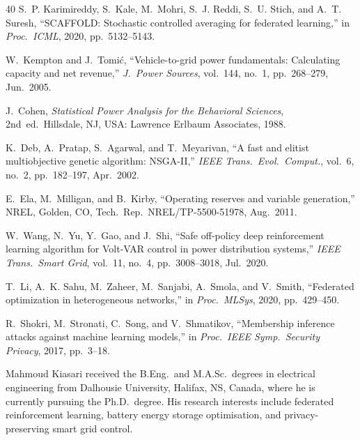 \documentclass[journal]{IEEEtran}
\begin{document}
\begin{thebibliography}{40}
S.~P. Karimireddy, S.\ Kale, M.\ Mohri, S.~J. Reddi, S.~U. Stich,
and A.~T. Suresh,
``SCAFFOLD: Stochastic controlled averaging for federated learning,''
in \textit{Proc.\ ICML}, 2020, pp.~5132--5143.

W.\ Kempton and J.\ Tomić,
``Vehicle-to-grid power fundamentals: Calculating capacity and net
revenue,''
\textit{J.~Power Sources}, vol.~144, no.~1, pp.~268--279, Jun.\ 2005.

J.\ Cohen,
\textit{Statistical Power Analysis for the Behavioral Sciences},
2nd~ed.\ Hillsdale, NJ, USA: Lawrence Erlbaum Associates, 1988.

K.\ Deb, A.\ Pratap, S.\ Agarwal, and T.\ Meyarivan,
``A fast and elitist multiobjective genetic algorithm: NSGA-II,''
\textit{IEEE Trans.\ Evol.\ Comput.}, vol.~6, no.~2, pp.~182--197,
Apr.\ 2002.

E.\ Ela, M.\ Milligan, and B.\ Kirby,
``Operating reserves and variable generation,''
NREL, Golden, CO, Tech.\ Rep.\ NREL/TP-5500-51978, Aug.\ 2011.

W.\ Wang, N.\ Yu, Y.\ Gao, and J.\ Shi,
``Safe off-policy deep reinforcement learning algorithm for Volt-VAR
control in power distribution systems,''
\textit{IEEE Trans.\ Smart Grid}, vol.~11, no.~4,
pp.~3008--3018, Jul.\ 2020.

T.~Li, A.~K. Sahu, M.~Zaheer, M.~Sanjabi, A.~Smola, and V.~Smith,
``Federated optimization in heterogeneous networks,''
in \textit{Proc.\ MLSys}, 2020, pp.~429--450.

R.\ Shokri, M.\ Stronati, C.\ Song, and V.\ Shmatikov,
``Membership inference attacks against machine learning models,''
in \textit{Proc.\ IEEE Symp.\ Security Privacy}, 2017, pp.~3--18.

\end{thebibliography}

\begin{IEEEbiographynophoto}{Mahmoud Kiasari}
received the B.Eng.\ and M.A.Sc.\ degrees in electrical engineering
from Dalhousie University, Halifax, NS, Canada, where he is currently
pursuing the Ph.D.\ degree. His research interests include federated
reinforcement learning, battery energy storage optimisation, and
privacy-preserving smart grid control.
\end{IEEEbiographynophoto}
\end{document}
